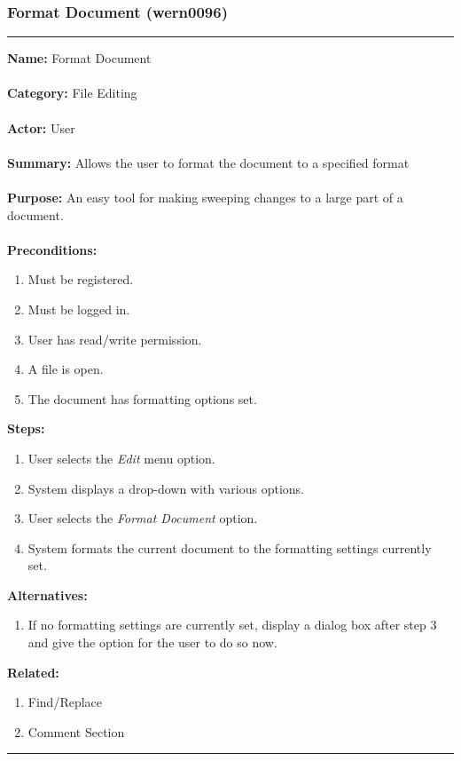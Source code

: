 \documentclass[11pt]{report}
\begin{document}
\subsubsection{Format Document (wern0096)}
\vspace{2pt}
\hrule
\vspace{8pt}
	\noindent\textbf{Name:} Format Document \\ \\
	\textbf{Category:} File Editing \\ \\
	\textbf{Actor:} User \\ \\
	\textbf{Summary:} Allows the user to format the document to a specified format \\ \\
	\textbf{Purpose:} An easy tool for making sweeping changes to a large part of a document. \\ \\
	\textbf{Preconditions:} 
	\begin{enumerate}
		\item Must be registered.
		\item Must be logged in.
		\item User has read/write permission.
		\item A file is open.
		\item The document has formatting options set.
	\end{enumerate}
	\textbf{Steps:}
	\begin{enumerate}
		\item User selects the \textit{Edit} menu option.
		\item System displays a drop-down with various options.
		\item User selects the \textit{Format Document} option.
		\item System formats the current document to the formatting settings currently set.
	\end{enumerate}
	\textbf{Alternatives:}
	\begin{enumerate}
		\item If no formatting settings are currently set, display a dialog box after step 3 and give the option for the user to do so now.
	\end{enumerate}
	\textbf{Related:}
	\begin{enumerate}
		\item Find/Replace
		\item Comment Section
	\end{enumerate}
\hrule
\vspace{8pt}
\end{document}

